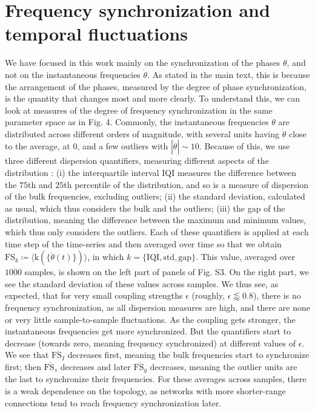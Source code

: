 \documentclass[reprint,onecolumn,superscriptaddress,showpacs,amsmath,amssymb,aps,prx,floatfix,]{revtex4-2}
\newcommand*{\walrus}{\ensuremath{\coloneqq}}
\begin{document}
\section{Frequency synchronization and temporal fluctuations}
We have focused in this work mainly on the synchronization of the phases $\theta$, and not on the instantaneous frequencies $\dot{\theta}$. As stated in the main text, this is because the arrangement of the phases, measured by the degree of phase synchronization, is the quantity that changes most and more clearly. To understand this, we can look at measures of the degree of frequency synchronization in the same parameter space as in Fig. 4. Commonly, the instantaneous frequencies $\dot{\theta}$ are distributed across different orders of magnitude, with several units having $\dot{\theta}$ close to the average, at $0$, and a few outliers with $|\dot{\theta}| \sim 10$. Because of this, we use three different dispersion quantifiers, measuring different aspects of the distribution : (i) the interquartile interval IQI measures the difference between the $75$th and $25$th percentile of the distribution, and so is a measure of dispersion of the bulk frequencies, excluding outliers; (ii) the standard deviation, calculated as usual, which thus considers the bulk and the outliers; (iii) the gap of the distribution, meaning the difference between the maximum and minimum values, which thus only considers the outliers. Each of these quantifiers is applied at each time step of the time-series and then averaged over time so that we obtain $\mathrm{FS}_k \walrus \langle \mathrm{k}( \{\dot{\theta}(t)\}) \rangle$, in which $k = \{\mathrm{IQI}, \mathrm{std}, \mathrm{gap}\}$. This value, averaged over $1000$ samples, is shown on the left part of panels of Fig. S3. On the right part, we see the standard deviation of these values across samples. We thus see, as expected, that for very small coupling strengths $\epsilon$ (roughly, $\epsilon \lessapprox 0.8$), there is no frequency synchronization, as all dispersion measures are high, and there are none or very little sample-to-sample fluctuations. As the coupling gets stronger, the instantaneous frequencies get more synchronized. But the quantifiers start to decrease (towards zero, meaning frequency synchronized) at different values of $\epsilon$. We see that $\overline{\mathrm{FS}_I}$ decreases first, meaning the bulk frequencies start to synchronize first; then $\overline{\mathrm{FS}_s}$ decreases and later $\overline{\mathrm{FS}_g}$ decreases, meaning the outlier units are the last to synchronize their frequencies. For these averages across samples, there is a weak dependence on the topology, as networks with more shorter-range connections tend to reach frequency synchronization later. 
\end{document}
